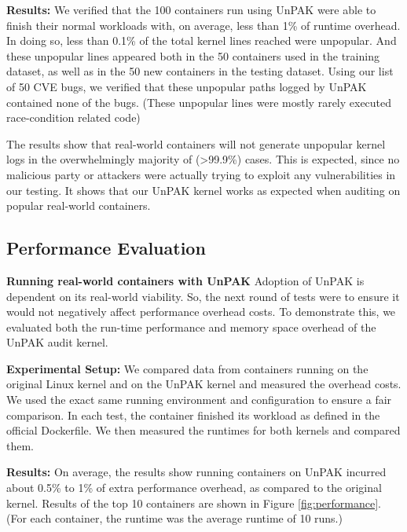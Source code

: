 \textbf{Results:}  We verified that the 100 containers run using UnPAK were able to finish their normal workloads with, on average, less than 1\% of runtime overhead. 
In doing so,  less than 0.1\% of the total kernel lines reached were unpopular. And these unpopular lines appeared both in the 50 containers used in the training dataset, 
as well as in the 50 new containers in the testing dataset. Using our list of 50 CVE bugs, we verified that these unpopular paths logged by UnPAK contained none of the bugs. 
(These unpopular lines were mostly rarely executed race-condition related code) 

The results show that real-world containers will not generate unpopular kernel logs in the overwhelmingly majority of (>99.9\%) cases. 
This is expected, since no malicious party or attackers were actually trying to exploit any vulnerabilities in our testing. 
It shows that our UnPAK kernel works as expected when auditing on popular real-world containers. 

\subsection{Performance Evaluation}
\label{sec.evaluation.4} 
\textbf{Running real-world containers with UnPAK}
\newline
Adoption of UnPAK is dependent on its real-world viability. So, the next round of tests were to ensure it would not negatively affect performance overhead costs. 
To demonstrate this, we evaluated both the run-time performance and memory space overhead of the UnPAK audit kernel.

\textbf{Experimental Setup:}
We compared data from containers running on the original Linux kernel and on the 
UnPAK kernel and measured the overhead costs. We used the exact same running environment and configuration to ensure a fair comparison. 
In each test, the container finished its workload as defined in the official Dockerfile. We then measured the runtimes for both kernels and compared them. 

\textbf{Results:} 
On average, the results show running containers on UnPAK incurred about 0.5\% to 1\% of extra performance overhead, as compared to the original kernel. 
Results of the top 10 containers are shown in Figure \ref{fig:performance}. (For each container, the runtime was the average runtime of 10 runs.)

